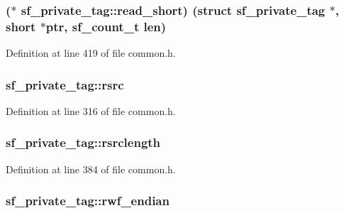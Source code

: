\subsubsection[{\texorpdfstring{read\+\_\+short}{read_short}}]{($\ast$ sf\+\_\+private\+\_\+tag\+::read\+\_\+short) (struct {\bf sf\+\_\+private\+\_\+tag} $\ast$, short $\ast$ptr, {\bf sf\+\_\+count\+\_\+t} {\bf len})}\hypertarget{structsf__private__tag_a7f813848322d038dbe4714d9121ac9f7}{}\label{structsf__private__tag_a7f813848322d038dbe4714d9121ac9f7}


Definition at line 419 of file common.\+h.

\subsubsection[{\texorpdfstring{rsrc}{rsrc}}]{ sf\+\_\+private\+\_\+tag\+::rsrc}\hypertarget{structsf__private__tag_ab48e56e819aa979392049439153314e6}{}\label{structsf__private__tag_ab48e56e819aa979392049439153314e6}


Definition at line 316 of file common.\+h.

\subsubsection[{\texorpdfstring{rsrclength}{rsrclength}}]{ sf\+\_\+private\+\_\+tag\+::rsrclength}\hypertarget{structsf__private__tag_afce8dce7d1ae259c82564e00bf4b6274}{}\label{structsf__private__tag_afce8dce7d1ae259c82564e00bf4b6274}


Definition at line 384 of file common.\+h.

\subsubsection[{\texorpdfstring{rwf\+\_\+endian}{rwf_endian}}]{ sf\+\_\+private\+\_\+tag\+::rwf\+\_\+endian}\hypertarget{structsf__private__tag_ab48d569db130b1bad1afb8e9288aa0e8}{}\label{structsf__private__tag_ab48d569db130b1bad1afb8e9288aa0e8}


